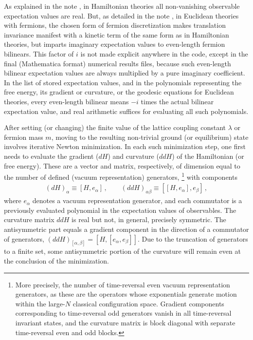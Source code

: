 \documentclass [12pt]{article}
\begin{document}
As explained in the note \cite{latticesymm},
in Hamiltonian theories
all non-vanishing observable expectation values are real.
But, as detailed in the note \cite{latticesymm},
in Euclidean 
theories with fermions, the chosen form of fermion discretization makes
translation invariance manifest with a kinetic term of the same
form as in Hamiltonian theories, but imparts imaginary expectation
values to even-length fermion bilinears.
This factor of $i$ is not made explicit anywhere in the code,
except in the final (Mathematica format) numerical results files,
because such even-length bilinear expectation values are always
multiplied by a pure imaginary coefficient.
In the list of stored expectation values,
and in
the polynomials representing the free energy, its gradient
or curvature, or the geodesic equations for Euclidean theories,
every even-length bilinear means $-i$ times the actual bilinear
expectation value, and
real arithmetic suffices for evaluating all such polynomials.

After setting (or changing) the finite value of the
lattice coupling constant $\lambda$
or fermion mass $m$,
moving to the resulting non-trivial ground (or equilibrium)
state involves iterative Newton minimization.
In each such minimization step,
one first needs to evaluate the gradient ($dH$) and curvature ($ddH$) of the
Hamiltonian (or free energy).
These are a vector and matrix, respectively, of dimension
equal to the number of defined (vacuum representation) generators,%
\footnote
    {%
    More precisely, the number of time-reversal even 
    vacuum representation generators, as these are the
    operators whose exponentials generate motion within
    the large-$N$ classical configuration space.
    Gradient components corresponding to time-reversal
    odd generators vanish in all time-reversal invariant
    states, and the curvature matrix is block diagonal
    with separate time-reversal even and odd blocks.
    }
with components
\begin{align}
    (dH)_\alpha \equiv [H, e_\alpha] \,,\qquad
    (ddH)_{\alpha\beta} \equiv [ [ H, e_\alpha], e_\beta] \,,
\label{eq:gradcurv}
\end{align}
where $e_\alpha$ denotes 
a vacuum representation generator,
and each commutator is a previously evaluated polynomial in the
expectation values of observables.
The curvature matrix $ddH$ is real but not, in general,
precisely symmetric.
The antisymmetric part equals
a gradient component in the direction of
a commutator of generators,
$
    (ddH)_{[\alpha, \beta]}
    =
    [H, [e_\alpha, e_\beta]]
$.
Due to the truncation of generators to a finite set,
some antisymmetric portion of the curvature will remain even
at the conclusion of the minimization.
%
\end{document}
